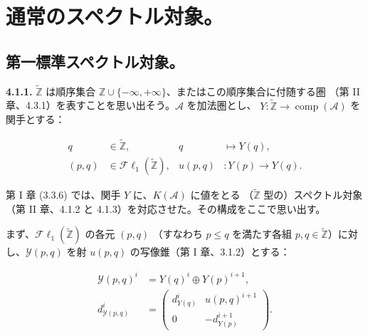 \chapter{通常のスペクトル対象。}
%
\begingroup
\small
\setlength{\parskip}{0pt}
\setlength{\emergencystretch}{1.5em}
\setlength{\abovedisplayskip}{4pt plus 2pt minus 2pt}%
\setlength{\belowdisplayskip}{4pt plus 2pt minus 2pt}%

\section{第一標準スペクトル対象。}

\noindent\textbf{4.1.1.}\quad
$\widetilde{\mathbb Z}$ は順序集合
$\mathbb Z\cup\{-\infty,+\infty\}$、またはこの順序集合に付随する圏
（第 II 章、4.3.1）を表すことを思い出そう。$\mathcal A$ を加法圏とし、
$Y\colon\widetilde{\mathbb Z}\longrightarrow
\operatorname{comp}(\mathcal A)$ を関手とする：

\begin{equation}
\begin{aligned}
q&\in\widetilde{\mathbb Z},
  &q&\longmapsto Y(q),\\
(p,q)&\in\mathcal{F}\ell_1(\widetilde{\mathbb Z}),
  &u(p,q)&\colon Y(p)\longrightarrow Y(q).
\end{aligned}
\tag{4.1.1.1}
\end{equation}

第 I 章 (3.3.6) では、関手 $Y$ に、$K(\mathcal A)$ に値をとる
（$\widetilde{\mathbb Z}$ 型の）スペクトル対象（第 II 章、4.1.2 と
4.1.3）を対応させた。その構成をここで思い出す。

まず、$\mathcal{F}\ell_1(\widetilde{\mathbb Z})$ の各元 $(p,q)$
（すなわち $p\leq q$ を満たす各組
$p,q\in\widetilde{\mathbb Z}$）に対し、$\mathcal Y(p,q)$ を射
$u(p,q)$ の写像錐（第 I 章、3.1.2）とする：

\begin{equation}
\begin{aligned}
\mathcal Y(p,q)^i&=Y(q)^i\oplus Y(p)^{i+1},\\
d_{\mathcal Y(p,q)}^i
&=
\begin{pmatrix}
d_{Y(q)}^i & u(p,q)^{i+1}\\
0 & -d_{Y(p)}^{i+1}
\end{pmatrix}.
\end{aligned}
\tag{4.1.1.2}
\end{equation}

